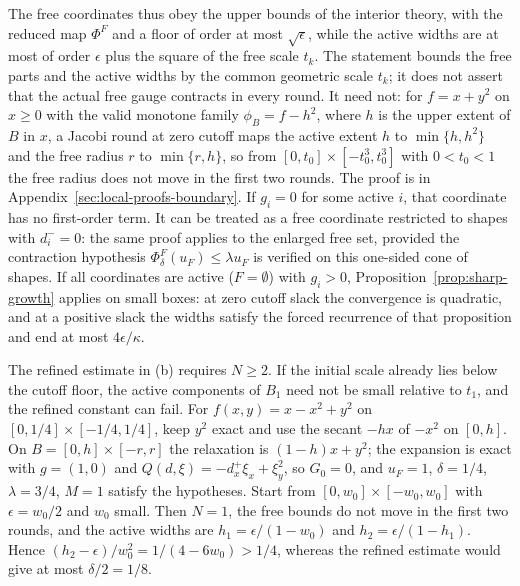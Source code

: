 The free coordinates thus obey the upper bounds of the interior theory,
with the reduced map $\Phi^F$ and a floor of order at most $\sqrt\epsilon$,
while the active widths are at most of order $\epsilon$ plus the square of
the free scale $t_k$. The statement bounds the free parts and the active
widths by the common geometric scale $t_k$; it does not assert that the
actual free gauge contracts in every round. It need not: for $f=x+y^2$ on
$x\ge0$ with the valid monotone family $\phi_B=f-h^2$, where $h$ is the
upper extent of $B$ in $x$, a Jacobi round at zero cutoff maps the active
extent $h$ to $\min\{h,h^2\}$ and the free radius $r$ to $\min\{r,h\}$, so from
$[0,t_0]\times[-t_0^3,t_0^3]$ with $0<t_0<1$ the free radius does not move in
the first two rounds. The proof is in Appendix~\ref{sec:local-proofs-boundary}. If
$g_i=0$ for some active $i$, that coordinate has no first-order term. It
can be treated as a free coordinate restricted to shapes with $d_i^-=0$:
the same proof applies to the enlarged free set, provided the contraction
hypothesis $\Phi^F_\delta(u_F)\le\lambda u_F$ is verified on this one-sided
cone of shapes. If all coordinates are active ($F=\emptyset$) with
$g_i>0$, Proposition~\ref{prop:sharp-growth} applies on small boxes: at zero
cutoff slack the convergence is quadratic, and at a positive slack the
widths satisfy the forced recurrence of that proposition and end at most
$4\epsilon/\kappa$.

The refined estimate in (b) requires $N\ge2$. If the initial scale already
lies below the cutoff floor, the active components of $B_1$ need not be
small relative to $t_1$, and the refined constant can fail. For
$f(x,y)=x-x^2+y^2$ on $[0,1/4]\times[-1/4,1/4]$, keep $y^2$ exact and use the
secant $-hx$ of $-x^2$ on $[0,h]$. On $B=[0,h]\times[-r,r]$ the relaxation is
$(1-h)x+y^2$; the expansion is exact with $g=(1,0)$ and
$Q(d,\xi)=-d_x^+\xi_x+\xi_y^2$, so $G_0=0$, and $u_F=1$, $\delta=1/4$,
$\lambda=3/4$, $M=1$ satisfy the hypotheses. Start from
$[0,w_0]\times[-w_0,w_0]$ with $\epsilon=w_0/2$ and $w_0$ small. Then $N=1$,
the free bounds do not move in the first two rounds, and the active widths
are $h_1=\epsilon/(1-w_0)$ and $h_2=\epsilon/(1-h_1)$. Hence
$(h_2-\epsilon)/w_0^2=1/(4-6w_0)>1/4$, whereas the refined estimate would give
at most $\delta/2=1/8$.

